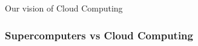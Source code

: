\documentclass[10pt,aspectratio=1609]{beamer}
\begin{document}
\begin{section}{Our vision of Cloud Computing}





\begin{frame}
  \frametitle{Supercomputers vs Cloud Computing}


\end{frame}
\end{section}
\end{document}
